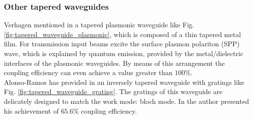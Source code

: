 \subsubsection*{Other tapered waveguides}
Verhagen mentioned in \cite{tapered_plasmonic_waveguides} a tapered plasmonic waveguide like Fig. \ref{fig:tapered_waveguide_plasmonic}, which is composed of a thin tapered metal film. For transmission input beams excite the surface plasmon polariton (SPP) wave, which is explained by quantum emission, provided by the metal/dielectric interfaces of the plasmonic waveguides. By means of this arrangement the coupling efficiency can even achieve a value greater than $100\%$.\\

Alonso-Ramos has provided in \cite{fiber_to_chip_grating_waveguides} an inversely tapered waveguide with gratings like Fig. \ref{fig:tapered_waveguide_grating}. The gratings of this waveguide are delicately designed to match the work mode: bloch mode. In \cite{fiber_to_chip_grating_waveguides} the author presented his achievement of $65.6\%$ coupling efficiency. \\

